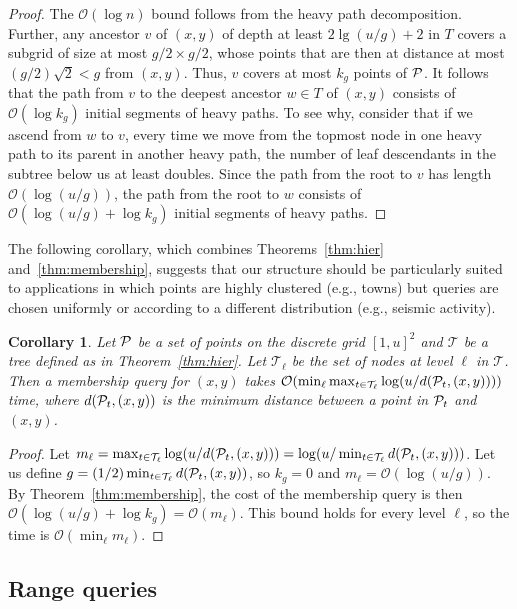 \documentclass{elsarticle}
\newtheorem{corollary}[theorem]{Corollary}
\newcommand{\Oh}[1]
  {\ensuremath{\mathcal{O}\!\left( {#1} \right)}}
\begin{document}
\begin{proof}
The $\Oh{\log n}$ bound follows from the heavy path decomposition. Further,
any ancestor $v$ of $(x,y)$ of depth at least \(2 \lg (u / g) + 2\) in $T$ covers a subgrid of size at most $g/2 \times g/2$, whose points that are then at distance at most $(g/2)\sqrt{2} < g$ from $(x,y)$. Thus, $v$ covers at most $k_g$ points of $\cal P$.  It follows that the path from $v$ to the deepest ancestor $w \in T$ of $(x,y)$ consists of $\Oh{\log k_g}$ initial segments of heavy paths.  To see why, consider that if we ascend from $w$ to $v$, every time we move from the topmost node in one heavy path to its parent in another heavy path, the number of leaf descendants in the subtree below us at least doubles.  Since the path from the root to $v$ has length $\Oh{\log (u / g)}$, the path from the root to $w$ consists of $\Oh{\log (u / g) + \log k_g}$ initial segments of heavy paths.
\end{proof}

The following corollary, which combines Theorems~\ref{thm:hier} and~\ref{thm:membership}, suggests that our structure should be particularly suited to applications in which points are highly clustered (e.g., towns) but queries are chosen uniformly or according to a different distribution (e.g., seismic activity). 

\begin{corollary} 
\label{cor:hier-query}
Let ${\cal P}$ be a set of points on the discrete grid $[1,u]^2$ and
$\mathcal{T}$ be a tree defined as in Theorem~\ref{thm:hier}.
Let $\mathcal{T}_\ell$ be the set of nodes at level $\ell$ in $\mathcal{T}$. Then a membership query for $(x,y)$ takes $\Oh{\min_\ell \max_{t \in \mathcal{T}_\ell} \log(u/d({\cal P}_t,(x,y)))}$ time, where $d({\cal P}_t,(x,y))$ is the minimum distance between a point in ${\cal P}_t$ and $(x,y)$.
\end{corollary}
\begin{proof}
Let $m_\ell = \max_{t \in \mathcal{T}_\ell}\log(u/d({\cal P}_t,(x,y))) = 
\log(u/\min_{t \in \mathcal{T}_\ell} d({\cal P}_t,(x,y)))$. Let us define
$g = (1/2) \min_{t \in \mathcal{T}_\ell} d({\cal P}_t,(x,y))$, so $k_g=0$
and $m_\ell = \Oh{\log(u/g)}$. By Theorem~\ref{thm:membership}, the cost
of the membership query is then $\Oh{\log(u/g)+\log k_g} = \Oh{m_\ell}$. This 
bound holds for every level $\ell$, so the time is $\Oh{\min_\ell m_\ell}$.
\end{proof}



\subsection{Range queries}
\end{document}
